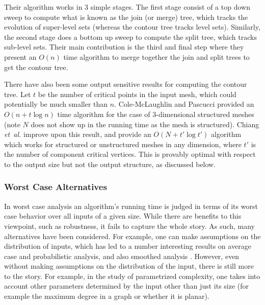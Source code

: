 \documentclass[11pt]{article}
\theoremstyle{definition}
\newcommand{\etal}{\textit{et~al.}\xspace}
\begin{document}
Their algorithm works in 3 simple stages.  
The first stage consist of a top down sweep to compute what is known as the join (or merge) tree, 
which tracks the evolution of super-level sets (whereas the contour tree tracks level sets).  
Similarly, the second stage does a bottom up sweep to compute the split tree, which tracks sub-level sets.  
Their main contribution is the third and final step where they present an $O(n)$ time algorithm to merge 
together the join and split trees to get the contour tree.  

There have also been some output sensitive results for computing the contour tree.  Let $t$ be the number 
of critical points in the input mesh, which could potentially be much smaller than $n$.  
Cole-McLaughlin and Pascucci \cite{pc-ectls-02} provided an $O(n+t\log n)$ time algorithm for the case of 
$3$-dimensional structured meshes (note $N$ does not show up in the running time as the mesh is structured).
Chiang \etal \cite{cllr-sooscctmp-05} improve upon this result, and provide an $O(N+t'\log t')$ algorithm 
which works for structured or unstructured meshes in any dimension, where $t'$ is the number of component 
critical vertices.  This is provably optimal with respect to the output size but not the output structure, 
as discussed below.




\subsubsection{Worst Case Alternatives}
In worst case analysis an algorithm's running time is judged in terms of its worst 
case behavior over all inputs of a given size.  While there are benefits to this viewpoint, 
such as robustness,  it fails to capture the whole story.  As such, many alternatives 
have been considered.  For example, one can make assumptions on the distribution of 
inputs, which has led to a number interesting results on average case and probabilistic 
analysis, and also smoothed analysis \cite{st-saa-04}.  However, even without making 
assumptions on the distribution of the input, there is still more to the story.
For example, in the study of parametrized complexity, one takes into account other 
parameters determined by the input other than just its size (for example the maximum 
degree in a graph or whether it is planar).
\end{document}
